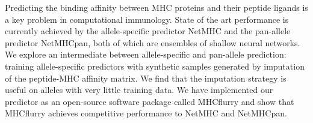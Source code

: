 Predicting the binding affinity between MHC proteins and their peptide ligands is a key problem in computational immunology. State of the art performance is currently achieved by the allele-specific predictor NetMHC and the pan-allele predictor NetMHCpan, both of which are ensembles of shallow neural networks. We explore an intermediate between allele-specific and pan-allele prediction: training allele-specific predictors with synthetic samples generated by imputation of the peptide-MHC affinity matrix. We find that the imputation strategy is useful on alleles with very little training data. We have implemented our predictor as an open-source software package called MHCflurry and show that MHCflurry achieves competitive performance to NetMHC and NetMHCpan.
